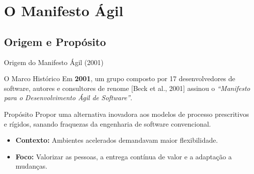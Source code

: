 \documentclass[aspectratio=169, 9pt]{beamer}
\begin{document}
\section{O Manifesto Ágil}

\subsection{Origem e Propósito}
\begin{frame}{Origem do Manifesto Ágil (2001)}
  \begin{block}{O Marco Histórico}
    Em \textbf{2001}, um grupo composto por 17 desenvolvedores de software, autores e consultores de renome [Beck et al., 2001] assinou o \textit{“Manifesto para o Desenvolvimento Ágil de Software”}.
  \end{block}

  \vspace{0.3cm}
  \begin{alertblock}{Propósito}
    Propor uma alternativa inovadora aos modelos de processo prescritivos e rígidos, sanando fraquezas da engenharia de software convencional.
  \end{alertblock}

  \vspace{0.3cm}
  \begin{itemize}
    \item \textbf{Contexto:} Ambientes acelerados demandavam maior flexibilidade.
    \item \textbf{Foco:} Valorizar as pessoas, a entrega contínua de valor e a adaptação a mudanças.
  \end{itemize}
\end{frame}

\def\drawpillar#1#2#3#4{
  \begin{scope}[shift={(#1,#2)}]
    \draw[pillar_base] (-1.3, 0) rectangle (1.3, 0.3);
    \draw[pillar_base] (-1.1, 0.3) rectangle (1.1, 0.6);
    \draw[pillar_body] (-0.9, 0.6) rectangle (0.9, 5.0);
    \draw[gray!30] (-0.45, 0.6) -- (-0.45, 5.0);
    \draw[gray!30] (0, 0.6) -- (0, 5.0);
    \draw[gray!30] (0.45, 0.6) -- (0.45, 5.0);
    \draw[pillar_top] (-1.1, 5.0) rectangle (1.1, 5.3);
    \draw[pillar_top] (-1.3, 5.3) rectangle (1.3, 5.6);
    
    \node[fill=gray!5, text width=1.65cm, align=center, inner sep=1pt] at (0, 2.8) {
      \textbf{\textcolor{structure.fg}{\footnotesize #3}}\\[0.2cm]
      \tiny #4
    };
  \end{scope}
}
\end{document}
